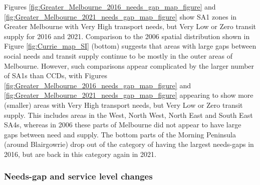 \documentclass[preprint, 3p,
authoryear]{elsarticle} %
\begin{document}
Figures \ref{fig:Greater_Melbourne_2016_needs_gap_map_figure} and
\ref{fig:Greater_Melbourne_2021_needs_gap_map_figure} show SA1 zones in
Greater Melbourne with Very High transport needs, but Very Low or Zero
transit supply for 2016 and 2021. Comparison to the 2006 spatial
distribution shown in Figure \ref{fig:Currie_map_SI} (bottom) suggests
that areas with large gaps between social needs and transit supply
continue to be mostly in the outer areas of Melbourne. However, such
comparisons appear complicated by the larger number of SA1s than CCDs,
with Figures \ref{fig:Greater_Melbourne_2016_needs_gap_map_figure} and
\ref{fig:Greater_Melbourne_2021_needs_gap_map_figure} appearing to show
more (smaller) areas with Very High transport needs, but Very Low or
Zero transit supply. This includes areas in the West, North West, North
East and South East SA4s, whereas in 2006 these parts of Melbourne did
not appear to have large gaps between need and supply. The bottom parts
of the Morning Peninsula (around Blairgowrie) drop out of the category
of having the largest needs-gaps in 2016, but are back in this category
again in 2021.

\hypertarget{needs-gap-and-service-level-changes}{%
\subsubsection{Needs-gap and service level
changes}\label{needs-gap-and-service-level-changes}}

\begingroup\fontsize{8}{10}\selectfont
\end{document}
